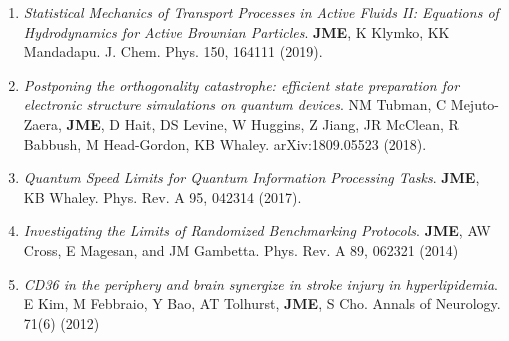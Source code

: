 \documentclass[]{article}
\begin{document}
\begin{enumerate}
\item  \textit{Statistical Mechanics of Transport Processes in Active Fluids II: Equations of Hydrodynamics for Active Brownian Particles}. \textbf{JME}, K Klymko, KK Mandadapu. J. Chem. Phys. 150, 164111 (2019).

\item \textit{Postponing the orthogonality catastrophe: efficient state preparation for electronic structure simulations on quantum devices}. NM Tubman, C Mejuto-Zaera, \textbf{JME}, D Hait, DS Levine, W Huggins, Z Jiang, JR McClean, R Babbush, M Head-Gordon, KB Whaley.	arXiv:1809.05523 (2018).



\item \textit{Quantum Speed Limits for Quantum Information Processing Tasks}. \textbf{JME}, KB Whaley. Phys. Rev. A 95, 042314 (2017).

\item \textit{Investigating the Limits of Randomized Benchmarking Protocols}. \textbf{JME}, AW Cross, E Magesan, and JM Gambetta. 
Phys. Rev. A 89, 062321 (2014) 

\item \textit{CD36 in the periphery and brain
	synergize in stroke injury in hyperlipidemia}. E Kim, M Febbraio, Y Bao, AT Tolhurst, \textbf{JME}, S Cho.  Annals of Neurology. 71(6) (2012)
\end{enumerate}
\end{document}

